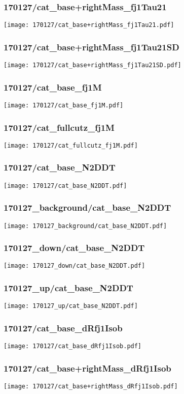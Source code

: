 \begin{frame}
   \frametitle{\small 170127/cat\_base+rightMass\_fj1Tau21}
   \centering
   \texttt{[image: 170127/cat\_base+rightMass\_fj1Tau21.pdf]}
\end{frame}

\begin{frame}
   \frametitle{\small 170127/cat\_base+rightMass\_fj1Tau21SD}
   \centering
   \texttt{[image: 170127/cat\_base+rightMass\_fj1Tau21SD.pdf]}
\end{frame}

\begin{frame}
   \frametitle{\small 170127/cat\_base\_fj1M}
   \centering
   \texttt{[image: 170127/cat\_base\_fj1M.pdf]}
\end{frame}

\begin{frame}
   \frametitle{\small 170127/cat\_fullcutz\_fj1M}
   \centering
   \texttt{[image: 170127/cat\_fullcutz\_fj1M.pdf]}
\end{frame}

\begin{frame}
   \frametitle{\small 170127/cat\_base\_N2DDT}
   \centering
   \texttt{[image: 170127/cat\_base\_N2DDT.pdf]}
\end{frame}

\begin{frame}
   \frametitle{\small 170127\_background/cat\_base\_N2DDT}
   \centering
   \texttt{[image: 170127\_background/cat\_base\_N2DDT.pdf]}
\end{frame}

\begin{frame}
   \frametitle{\small 170127\_down/cat\_base\_N2DDT}
   \centering
   \texttt{[image: 170127\_down/cat\_base\_N2DDT.pdf]}
\end{frame}

\begin{frame}
   \frametitle{\small 170127\_up/cat\_base\_N2DDT}
   \centering
   \texttt{[image: 170127\_up/cat\_base\_N2DDT.pdf]}
\end{frame}

\begin{frame}
   \frametitle{\small 170127/cat\_base\_dRfj1Isob}
   \centering
   \texttt{[image: 170127/cat\_base\_dRfj1Isob.pdf]}
\end{frame}

\begin{frame}
   \frametitle{\small 170127/cat\_base+rightMass\_dRfj1Isob}
   \centering
   \texttt{[image: 170127/cat\_base+rightMass\_dRfj1Isob.pdf]}
\end{frame}

